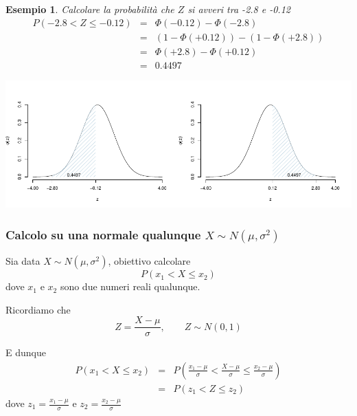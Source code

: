 \documentclass[
  11pt,
]{book}
\theoremstyle{mytheoremstyle}
\theoremstyle{mydefstyle}
\newtheorem{example}{{Esempio}}[section]
\begin{document}
\begin{example}

Calcolare la probabilità che \(Z\) si avveri tra -2.8 e -0.12
\begin{eqnarray*}
P(-2.8< Z \leq -0.12) &=& \Phi(-0.12)-\Phi(-2.8) \\
                         &=& (1-\Phi(+0.12))-(1-\Phi(+2.8)) \\
                         &=& \Phi(+2.8)-\Phi(+0.12)\\
                         &=& 0.4497
\end{eqnarray*}

\begin{center}\includegraphics{Appunti_di_Statistica_2025_files/figure-latex/07c-Normale-25,-1} \end{center}

\end{example}

\subsubsection{\texorpdfstring{Calcolo su una normale qualunque \(X\sim N(\mu,\sigma^2)\)}{Calcolo su una normale qualunque X\textbackslash sim N(\textbackslash mu,\textbackslash sigma\^{}2)}}\label{calcolo-su-una-normale-qualunque-xsim-nmusigma2}

Sia data \(X\sim N(\mu,\sigma^2)\), obiettivo calcolare
\[P(x_1<X\leq x_2)\]
dove \(x_1\) e \(x_2\) sono due numeri reali qualunque.

Ricordiamo che
\[Z=\frac {X-\mu}\sigma,\qquad Z\sim N(0,1)\]

E dunque
\begin{eqnarray*}
P(x_1<X\leq x_2) &=& P\left( \frac {x_1 - \mu}\sigma < \frac {X - \mu}\sigma \leq \frac {x_2 - \mu}\sigma\right) \\
                  &=& P(z_1<Z\leq z_2)  
\end{eqnarray*}
dove \(z_1=\frac {x_1 - \mu}\sigma\) e \(z_2=\frac {x_2 - \mu}\sigma\)
\end{document}

